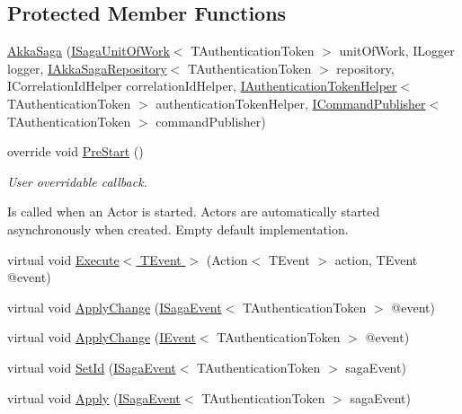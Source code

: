 \subsection*{Protected Member Functions}
\begin{DoxyCompactItemize}
\item 
\hyperlink{classCqrs_1_1Akka_1_1Domain_1_1AkkaSaga_a2f0ebb5d1d22e3112d5b9a09fde7fb47_a2f0ebb5d1d22e3112d5b9a09fde7fb47}{Akka\+Saga} (\hyperlink{interfaceCqrs_1_1Domain_1_1ISagaUnitOfWork}{I\+Saga\+Unit\+Of\+Work}$<$ T\+Authentication\+Token $>$ unit\+Of\+Work, I\+Logger logger, \hyperlink{interfaceCqrs_1_1Akka_1_1Domain_1_1IAkkaSagaRepository}{I\+Akka\+Saga\+Repository}$<$ T\+Authentication\+Token $>$ repository, I\+Correlation\+Id\+Helper correlation\+Id\+Helper, \hyperlink{interfaceCqrs_1_1Authentication_1_1IAuthenticationTokenHelper}{I\+Authentication\+Token\+Helper}$<$ T\+Authentication\+Token $>$ authentication\+Token\+Helper, \hyperlink{interfaceCqrs_1_1Commands_1_1ICommandPublisher}{I\+Command\+Publisher}$<$ T\+Authentication\+Token $>$ command\+Publisher)
\item 
override void \hyperlink{classCqrs_1_1Akka_1_1Domain_1_1AkkaSaga_a4615beae56f595074f3ba643a890ba74_a4615beae56f595074f3ba643a890ba74}{Pre\+Start} ()
\begin{DoxyCompactList}\small\item\em User overridable callback. 

Is called when an Actor is started. Actors are automatically started asynchronously when created. Empty default implementation. \end{DoxyCompactList}\item 
virtual void \hyperlink{classCqrs_1_1Akka_1_1Domain_1_1AkkaSaga_ac0782ac0b7e28418a52cead1b7b8b0c3_ac0782ac0b7e28418a52cead1b7b8b0c3}{Execute$<$ T\+Event $>$} (Action$<$ T\+Event $>$ action, T\+Event @event)
\item 
virtual void \hyperlink{classCqrs_1_1Akka_1_1Domain_1_1AkkaSaga_a42126a6a1a7896d16412b6023f208f7c_a42126a6a1a7896d16412b6023f208f7c}{Apply\+Change} (\hyperlink{interfaceCqrs_1_1Events_1_1ISagaEvent}{I\+Saga\+Event}$<$ T\+Authentication\+Token $>$ @event)
\item 
virtual void \hyperlink{classCqrs_1_1Akka_1_1Domain_1_1AkkaSaga_a18d554cd5ad329ab152efb7d852f2438_a18d554cd5ad329ab152efb7d852f2438}{Apply\+Change} (\hyperlink{interfaceCqrs_1_1Events_1_1IEvent}{I\+Event}$<$ T\+Authentication\+Token $>$ @event)
\item 
virtual void \hyperlink{classCqrs_1_1Akka_1_1Domain_1_1AkkaSaga_a3f3cf1a10203a1eead599e7529d41613_a3f3cf1a10203a1eead599e7529d41613}{Set\+Id} (\hyperlink{interfaceCqrs_1_1Events_1_1ISagaEvent}{I\+Saga\+Event}$<$ T\+Authentication\+Token $>$ saga\+Event)
\item 
virtual void \hyperlink{classCqrs_1_1Akka_1_1Domain_1_1AkkaSaga_a4a12310825f2d2cc5963eee4cc4ed802_a4a12310825f2d2cc5963eee4cc4ed802}{Apply} (\hyperlink{interfaceCqrs_1_1Events_1_1ISagaEvent}{I\+Saga\+Event}$<$ T\+Authentication\+Token $>$ saga\+Event)
\end{DoxyCompactItemize}
